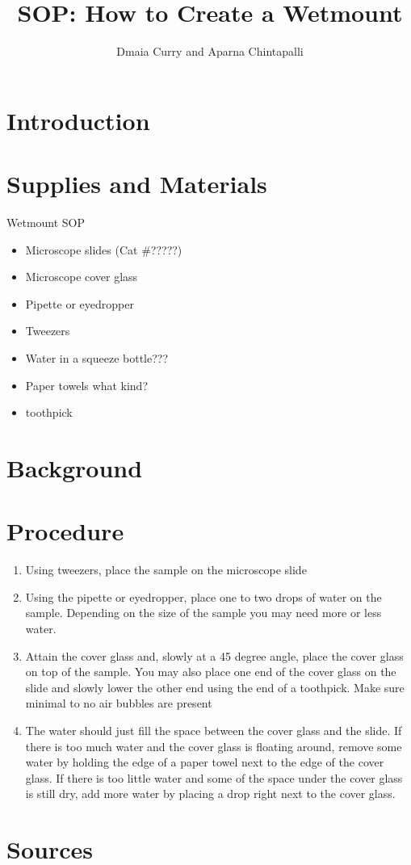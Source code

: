 \documentclass{article}
\title{SOP: How to Create a Wetmount}
\author{Dmaia Curry and Aparna Chintapalli}
\begin{document}


\maketitle

\section{Introduction}

\section{Supplies and Materials}
Wetmount SOP 
\begin{itemize}
  \item Microscope slides (Cat \#?????)
  \item Microscope cover glass
  \item Pipette or eyedropper
  \item Tweezers
  \item Water in a squeeze bottle???
  \item Paper towels what kind?
  \item toothpick
  
\end{itemize}

\section{Background}


\section{Procedure} 

\begin{enumerate}
  \item Using tweezers, place the sample on the microscope slide
  \item Using the pipette or eyedropper, place one to two drops of water on the sample. Depending on the size of the sample you may need more or less water. 
  \item Attain the cover glass and, slowly at a 45 degree angle, place the cover glass on top of the sample. You may also place one end of the cover glass on the slide and slowly lower the other end using the end of a toothpick. Make sure minimal to no air bubbles are present
  \item The water should just fill the space between the cover glass and the slide. If there is too much water and the cover glass is floating around, remove some water by holding the edge of a paper towel next to the edge of the cover glass. If there is too little water and some of the space under the cover glass is still dry, add more water by placing a drop right next to the cover glass.
  
\end{enumerate}

\section{Sources}

\end{document}
